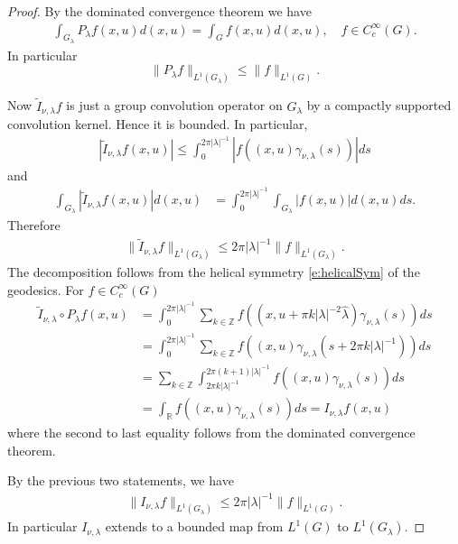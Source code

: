 \documentclass[10pt,a4paper]{amsart}
\def\R{{\mathbb R}}%
\begin{document}
\begin{proof}
	By the dominated convergence theorem we have
	\begin{align*}
		\int_{G_{\lambda}}P_{\lambda}f(x, u)d(x, u)=\int_G f(x, u)d(x, u), \quad f\in C_c^\infty(G).
	\end{align*}
	In particular $$\|P_{\lambda}f\|_{L^1(G_{\lambda})}\leq \|f\|_{L^1(G)}.$$
	
	Now $\widetilde{I}_{\nu, \lambda}f$ is just a group convolution operator on $G_{\lambda}$ by a compactly supported convolution kernel. Hence it is bounded. In particular, 
	\begin{align*}
		|\widetilde{I}_{\nu, \lambda}f(x, u)|\leq \int_0^{2\pi |\lambda|^{-1}}|f\left((x, u)\gamma_{\nu, \lambda}(s)\right)|ds
	\end{align*}
	and 
	\begin{align*}
		\int_{G_\lambda}|\widetilde{I}_{\nu, \lambda} f(x, u)|d(x, u)
		&=\int_0^{2\pi |\lambda|^{-1}} \int_{G_\lambda}|f\left(x, u\right)|d(x, u)ds.
	\end{align*}
	Therefore
	\begin{align*}
		\|\widetilde{I}_{\nu, \lambda} f\|_{L^1(G_\lambda)}\leq 2\pi  |\lambda|^{-1}\|f\|_{L^1(G_{\lambda})}.
	\end{align*}
	The decomposition follows from the helical symmetry \eqref{e:helicalSym} of the geodesics. For $f\in C_c^\infty(G)$ 
	\begin{align*}
		\widetilde{I}_{\nu, \lambda}\circ P_{\lambda}f(x, u)
		&=\int_0^{2\pi  |\lambda|^{-1}}\sum_{k\in\mathbb{Z}}f\left((x, u+\pi k|\lambda|^{-2}\hat{\lambda})\gamma_{\nu, \lambda}(s)\right)ds\\
		&=\int_0^{2\pi  |\lambda|^{-1}}\sum_{k\in\mathbb{Z}}f\left((x, u)\gamma_{\nu, \lambda}(s+2\pi k|\lambda|^{-1})\right)ds	\\
		&=\sum_{k\in\mathbb{Z}}\int_{2\pi k |\lambda|^{-1}}^{2\pi (k+1) |\lambda|^{-1}}f\left((x, u)\gamma_{\nu, \lambda}(s)\right)ds	\\
		&=\int_\R f\left((x, u)\gamma_{\nu, \lambda}(s)\right)ds=I_{\nu, \lambda}f(x, u)
	\end{align*}
	where the second to last equality follows from the dominated convergence theorem. 
	
	By the previous two statements, we have
	\begin{align*}
		\| I_{\nu, \lambda} f\|_{L^1(G_\lambda)}\leq 2\pi |\lambda|^{-1}\|f\|_{L^1(G)}.
	\end{align*}
	In particular $I_{\nu, \lambda}$ extends to a bounded map from $L^1(G)$ to $L^1(G_\lambda)$. 
\end{proof}
\end{document}

